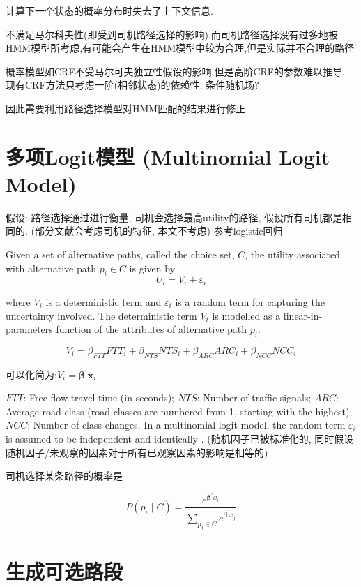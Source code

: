 计算下一个状态的概率分布时失去了上下文信息.

不满足马尔科夫性(即受到司机路径选择的影响),而司机路径选择没有过多地被HMM模型所考虑,有可能会产生在HMM模型中较为合理,但是实际并不合理的路径

概率模型如CRF不受马尔可夫独立性假设的影响,但是高阶CRF的参数难以推导. 现有CRF方法只考虑一阶(相邻状态)的依赖性. 条件随机场?

因此需要利用路径选择模型对HMM匹配的结果进行修正.

\section{多项Logit模型 (Multinomial Logit Model)}

假设: 路径选择通过进行衡量, 司机会选择最高utility的路径, 假设所有司机都是相同的. (部分文献会考虑司机的特征, 本文不考虑) 参考logistic回归

Given a set of alternative paths, called the choice set, $ C $, the utility associated with alternative path $ p_{i} \in C $ is given by
$$
U_{i}=V_{i}+\varepsilon_{i}
$$

where $ V_{i} $ is a deterministic term and $ \varepsilon_{i} $ is a random term for capturing the uncertainty involved. The deterministic term $ V_{i} $ is modelled as a linear-in-parameters function of the attributes of alternative path $ p_{i} $. 

$$ V_{i}=\beta_{F T T} F T T_{i}+\beta_{N T S} N T S_{i}+\beta_{A R C} A R C_{i}+\beta_{N C C} N C C_{i} $$

可以化简为:$ V_{i}=\boldsymbol{\beta}^{\prime} \boldsymbol{x}_{i} $

$FTT$: Free-flow travel time (in seconds); $N T S$: Number of traffic signals; $ARC$: Average road class (road classes are numbered from 1, starting with the highest); $NCC$: Number of class changes. In a multinomial logit model, the random term $ \varepsilon_{i} $ is assumed to be independent and identically . (随机因子已被标准化的, 同时假设随机因子/未观察的因素对于所有已观察因素的影响是相等的)

司机选择某条路径的概率是

$$ P\left(p_{i} \mid C\right)=\frac{e^{\boldsymbol{\beta}^{\prime} x_{i}}}{\sum_{p_{j} \in C} e^{\beta^{\prime} x_{j}}} $$

\section{生成可选路段}

